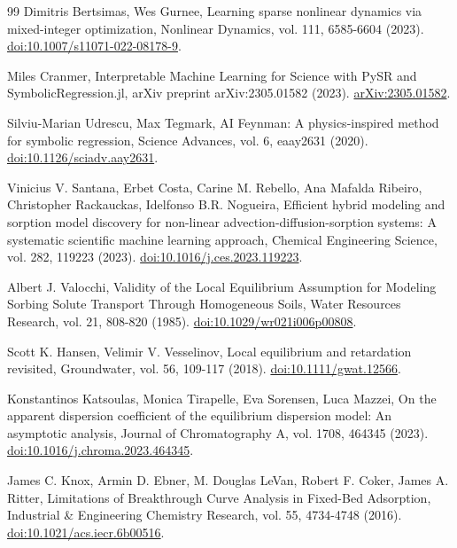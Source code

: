 \begin{thebibliography}{99}
 Dimitris Bertsimas, Wes Gurnee, Learning sparse nonlinear dynamics via mixed-integer optimization, Nonlinear Dynamics, vol. 111, 6585-6604 (2023). \href{https://doi.org/10.1007/s11071-022-08178-9}{doi:10.1007/s11071-022-08178-9}.

 Miles Cranmer, Interpretable Machine Learning for Science with PySR and SymbolicRegression.jl, arXiv preprint arXiv:2305.01582 (2023). \href{https://arxiv.org/abs/2305.01582}{arXiv:2305.01582}.

 Silviu-Marian Udrescu, Max Tegmark, AI Feynman: A physics-inspired method for symbolic regression, Science Advances, vol. 6, eaay2631 (2020). \href{https://doi.org/10.1126/sciadv.aay2631}{doi:10.1126/sciadv.aay2631}.

 Vinicius V. Santana, Erbet Costa, Carine M. Rebello, Ana Mafalda Ribeiro, Christopher Rackauckas, Idelfonso B.R. Nogueira, Efficient hybrid modeling and sorption model discovery for non-linear advection-diffusion-sorption systems: A systematic scientific machine learning approach, Chemical Engineering Science, vol. 282, 119223 (2023). \href{https://doi.org/10.1016/j.ces.2023.119223}{doi:10.1016/j.ces.2023.119223}.

 Albert J. Valocchi, Validity of the Local Equilibrium Assumption for Modeling Sorbing Solute Transport Through Homogeneous Soils, Water Resources Research, vol. 21, 808-820 (1985). \href{https://doi.org/10.1029/wr021i006p00808}{doi:10.1029/wr021i006p00808}.

 Scott K. Hansen, Velimir V. Vesselinov, Local equilibrium and retardation revisited, Groundwater, vol. 56, 109-117 (2018). \href{https://doi.org/10.1111/gwat.12566}{doi:10.1111/gwat.12566}.

 Konstantinos Katsoulas, Monica Tirapelle, Eva Sorensen, Luca Mazzei, On the apparent dispersion coefficient of the equilibrium dispersion model: An asymptotic analysis, Journal of Chromatography A, vol. 1708, 464345 (2023). \href{https://doi.org/10.1016/j.chroma.2023.464345}{doi:10.1016/j.chroma.2023.464345}.

 James C. Knox, Armin D. Ebner, M. Douglas LeVan, Robert F. Coker, James A. Ritter, Limitations of Breakthrough Curve Analysis in Fixed-Bed Adsorption, Industrial \& Engineering Chemistry Research, vol. 55, 4734-4748 (2016). \href{https://doi.org/10.1021/acs.iecr.6b00516}{doi:10.1021/acs.iecr.6b00516}.


\end{thebibliography}
